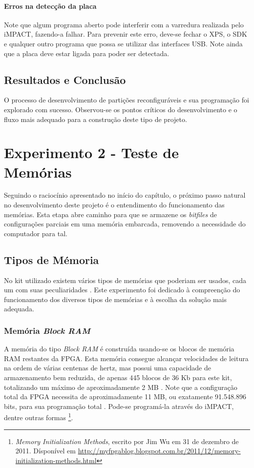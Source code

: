 \documentclass[11pt,a4paper,oneside]{book}
\begin{document}
\subsubsection{Erros na detecção da placa}
Note que algum programa aberto pode interferir com a varredura realizada pelo iMPACT, fazendo-a falhar.
Para prevenir este erro, deve-se fechar o XPS, o SDK e qualquer outro programa que possa se utilizar das interfaces USB.
Note ainda que a placa deve estar ligada para poder ser detectada.

\section{Resultados e Conclusão}
O processo de desenvolvimento de partições reconfiguráveis e sua programação foi explorado com sucesso.
Observou-se os pontos críticos do desenvolvimento e o fluxo mais adequado para a construção deste tipo de projeto.

\chapter{Experimento 2 - Teste de Memórias}
Seguindo o raciocínio apresentado no início do capítulo, o próximo passo natural no desenvolvimento deste projeto é o entendimento do funcionamento das memórias.
Esta etapa abre caminho para que se armazene os \textit{bitfiles} de configurações parciais em uma memória embarcada, removendo a necessidade do computador para tal.

\section{Tipos de Mémoria}

No kit utilizado existem vários tipos de memórias que poderiam ser usados, cada um com suas peculiaridades \cite{ug810}.
Este experimento foi dedicado à compreenção do funcionamento dos diversos tipos de memórias e à escolha da solução mais adequada.

\subsection{Memória \textit{Block RAM}}
A memória do tipo \textit{Block RAM} é construída usando-se os blocos de memória RAM restantes da FPGA.
Esta memória consegue alcançar velocidades de leitura na ordem de várias centenas de hertz, mas possui uma capacidade de armazenamento bem reduzida, de apenas 445 blocos de 36 Kb para este kit, totalizando um máximo de aproximadamente 2 MB \cite{ug473, wp377}.
Note que a configuração total da FPGA necessita de aproximadamente 11 MB, ou exatamente 91.548.896 bits, para sua programação total \cite{ug470}.
Pode-se programá-la através do iMPACT, dentre outras formas \footnote{\textit{Memory Initialization Methods}, escrito por Jim Wu em 31 de dezembro de 2011. Dísponível em \url{http://myfpgablog.blogspot.com.br/2011/12/memory-initialization-methods.html}}.
\end{document}
